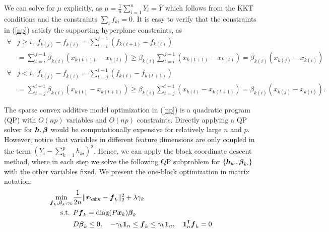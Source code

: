 We can solve for $\mu$ explicitly, as  
$\mu = \frac{1}{n} \sum_{i=1}^n Y_i = \bar{Y}$ which follows from the
KKT conditions
and the constraints $\sum_i f_{ki} = 0$.
It is easy to verify that the constraints in (\ref{np}) satisfy the supporting hyperplane constraints, as
\begin{align*}
  \forall & j\geq i, \; f_{k(j)}-f_{k(i)}  = \sum\limits_{t=i}^{j-1}(f_{k(t+1)}-f_{k(t)}) \\
   &= \sum\limits_{t=i}^{j-1}\beta_{k(t)}(x_{k(t+1)}-x_{k(t)})
   \geq \beta_{k(i)}\sum\limits_{t=i}^{j-1}(x_{k(t+1)}-x_{k(t)}) 
  = \beta_{k(i)}(x_{k(j)}-x_{k(i)}) \\
  \forall & j<i,\;  f_{k(j)}-f_{k(i)} =
                \sum\limits_{t=j}^{i-1}(f_{k(t)}-f_{k(t+1)}) \\
     & = \sum\limits_{t=j}^{i-1}\beta_{k(t)}(x_{k(t)}-x_{k(t+1)}) 
     \geq \beta_{k(i)}\sum\limits_{t=j}^{i-1}(x_{k(t)}-x_{k(t+1)}) = \beta_{k(i)}(x_{k(j)}-x_{k(i)}).
\end{align*}



The sparse convex additive model optimization in (\ref{np}) is a quadratic program (QP) with
$O(np)$ variables and $O(np)$ constraints. 
Directly applying a QP solver for $\boldsymbol{h},
\boldsymbol{\beta}$ would be computationally expensive for relatively large
$n$ and $p$. However, notice that variables in different feature
dimensions are only coupled in the term
$(Y_{i}-\sum_{k=1}^{p}h_{ki})^{2}$. Hence, we can apply the block
coordinate descent method, where in each step we solve the following
QP subproblem for $\{\boldsymbol{h}_{k\cdot},\boldsymbol{\beta}_{k\cdot}\}$ with the
other variables fixed. We present the one-block optimization in matrix notation:
\begin{align*}
\min_{ \bds{f}_k, \bds{\beta}_k, \gamma_k}& \frac{1}{2n} \| \bds{r}_{\mh k} - \bds{f}_k \|_2^2 
     + \lambda \gamma_k \\
 \textrm{s.t. } & P \bds{f}_k = \diag(P \bds{x}_k)  \bds{\beta}_k \\
   & D \bds{\beta}_k \leq 0 ,
   \quad -\gamma_k \mathbf{1}_n \leq \bds{f}_k \leq \gamma_k \mathbf{1}_n,
   \quad \mathbf{1}_n^\tran \bds{f}_k = 0
\end{align*}

